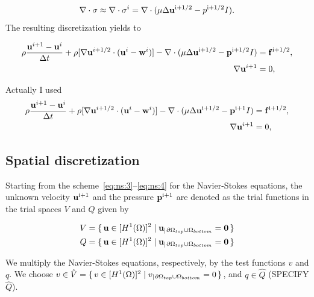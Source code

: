 \documentclass[11pt,a4paper,titlepage]{report}
\begin{document}
\begin{equation}
\nabla \cdot \sigma \approx \nabla \cdot \sigma^i = \nabla \cdot (\mu \Delta \mathbf{u}^{\rm i+1/2} - p^{\rm i+1/2} I).
\end{equation}
The resulting discretization yields to

\begin{align}
\rho \frac{\mathbf{u}^{i+1} - \mathbf{u}^i}{\Delta t} + \rho [\nabla \mathbf{u}^{i+1/2} \cdot (\mathbf{u}^i - \mathbf{w}^i)] - \nabla \cdot (\mu \Delta \mathbf{u}^{\rm  i+1/2} - \mathbf{p}^{\rm i+1/2}I) &= \mathbf{f}^{\rm i+1/2}, \\
\nabla \mathbf{u}^{i+1} &= 0,
\end{align}

Actually I used
\begin{align}
 \label{eq:ns:3}
\rho \frac{\mathbf{u}^{i+1} - \mathbf{u}^i}{\Delta t} + \rho [\nabla \mathbf{u}^{i+1/2} \cdot (\mathbf{u}^i - \mathbf{w}^i)] - \nabla \cdot (\mu \Delta \mathbf{u}^{\rm  i+1/2} - \mathbf{p}^{\rm i+1}I) &= \mathbf{f}^{\rm i+1/2}, \\
 \label{eq:ns:4}
\nabla \mathbf{u}^{i+1} &= 0,
\end{align}

\subsection{Spatial discretization}
Starting from the scheme~\eqref{eq:ns:3}--\eqref{eq:ns:4} for the Navier-Stokes equations, the unknown velocity $\mathbf{u}^{\rm i + 1}$ and the pressure $\mathbf{p}^{\rm i + 1}$ are denoted as the trial functions in the trial spaces $V$ and $Q$ given by

\begin{align*}
V &= \set{\mathbf{u} \in [H^1(\Omega)]^2 | \mathbf{u}_|{_{\partial \Omega_{top} \cup \Omega_{bottom}}} = \mathbf{0}} \\
Q &= \set{\mathbf{u} \in [H^1(\Omega)]^2 | \mathbf{u}_|{_{\partial \Omega_{top} \cup \Omega_{bottom}}} = \mathbf{0}}
\end{align*}



We multiply the Navier-Stokes equations, respectively, by the test functions $v$ and $q$. We choose $v \in \hat{V} = \set{v \in [H^1(\Omega)]^2 | v_|{_{\partial \Omega_{top} \cup \Omega_{bottom}}} = 0}$, and $q \in \hat{Q}$ (SPECIFY $\hat{Q}$).

\end{document}
